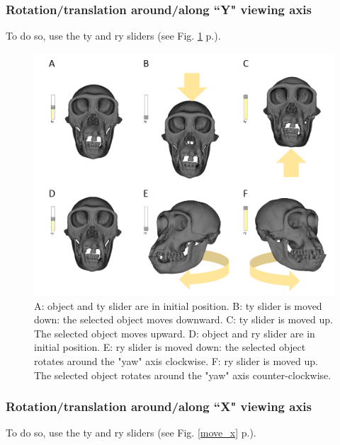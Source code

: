 \subsubsection{Rotation/translation around/along ``Y" viewing axis}

To do so, use the ty and ry sliders (see Fig. \ref{move_y} p.\pageref{move_y}).

\begin{figure}
  \centering
  \includegraphics[scale=0.45]{images/06/objects/move_objects_y.png} 
	\caption{A: object and ty slider are in initial position. B: ty slider is moved down: the selected object moves downward. C: ty slider is moved up. The selected object moves upward. D: object and ry slider are in initial position. E: ry slider is moved down: the selected object rotates around the "yaw" axis clockwise. F: ry slider is moved up. The selected object rotates around the "yaw" axis counter-clockwise.}
\label{move_y}
 
\end{figure}



\subsubsection{Rotation/translation around/along ``X" viewing axis}

To do so, use the ty and ry sliders (see Fig. \ref{move_x} p.\pageref{move_x}).

